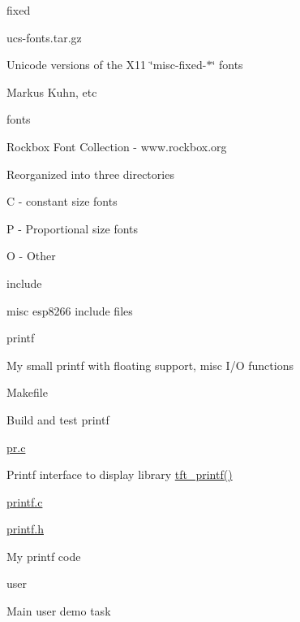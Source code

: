 \begin{DoxyItemize}
\begin{DoxyItemize}
\begin{DoxyItemize}
\item fixed
\begin{DoxyItemize}
\item ucs-\/fonts.\-tar.\-gz
\item Unicode versions of the X11 \char`\"{}misc-\/fixed-\/$\ast$\char`\"{} fonts
\item Markus Kuhn, etc
\end{DoxyItemize}
\item fonts
\begin{DoxyItemize}
\item Rockbox Font Collection -\/ www.\-rockbox.\-org
\item Reorganized into three directories
\begin{DoxyItemize}
\item C -\/ constant size fonts
\item P -\/ Proportional size fonts
\item O -\/ Other
\end{DoxyItemize}
\end{DoxyItemize}
\end{DoxyItemize}
\end{DoxyItemize}
\item include
\begin{DoxyItemize}
\item misc esp8266 include files
\end{DoxyItemize}
\item printf
\begin{DoxyItemize}
\item My small printf with floating support, misc I/\-O functions
\begin{DoxyItemize}
\item Makefile
\begin{DoxyItemize}
\item Build and test printf
\end{DoxyItemize}
\item \hyperlink{pr_8c}{pr.\-c}
\begin{DoxyItemize}
\item Printf interface to display library \hyperlink{pr_8c_a2d4b0a4bb23937481d2e28522eb7e5eb}{tft\-\_\-printf()}
\end{DoxyItemize}
\item \hyperlink{printf_8c}{printf.\-c}
\item \hyperlink{printf_8h}{printf.\-h}
\begin{DoxyItemize}
\item My printf code
\end{DoxyItemize}
\end{DoxyItemize}
\end{DoxyItemize}
\item user
\begin{DoxyItemize}
\item Main user demo task 
\end{DoxyItemize}
\end{DoxyItemize}